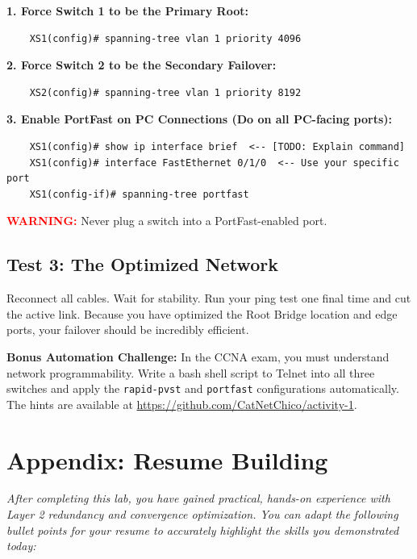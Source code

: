 \documentclass[11pt]{article}
\begin{document}
\noindent\textbf{1. Force Switch 1 to be the Primary Root:}
\begin{verbatim}
    XS1(config)# spanning-tree vlan 1 priority 4096 
\end{verbatim}

\noindent\textbf{2. Force Switch 2 to be the Secondary Failover:}
\begin{verbatim}
    XS2(config)# spanning-tree vlan 1 priority 8192
\end{verbatim}

\noindent\textbf{3. Enable PortFast on PC Connections (Do on all PC-facing ports):}
\begin{verbatim}
    XS1(config)# show ip interface brief  <-- [TODO: Explain command]
    XS1(config)# interface FastEthernet 0/1/0  <-- Use your specific port
    XS1(config-if)# spanning-tree portfast
\end{verbatim}
\textcolor{red}{\textbf{WARNING:}} Never plug a switch into a PortFast-enabled port. 

\vspace{0.5em}
\noindent {}

\subsection*{Test 3: The Optimized Network}
Reconnect all cables. Wait for stability. Run your ping test one final time and cut the active link. Because you have optimized the Root Bridge location and edge ports, your failover should be incredibly efficient.

\vspace{1em}
\noindent\textbf{Bonus Automation Challenge:} 
In the CCNA exam, you must understand network programmability. Write a bash shell script to Telnet into all three switches and apply the \texttt{rapid-pvst} and \texttt{portfast} configurations automatically. The hints are available at \url{https://github.com/CatNetChico/activity-1}. 

\newpage

\section*{Appendix: Resume Building}

\textit{After completing this lab, you have gained practical, hands-on experience with Layer 2 redundancy and convergence optimization. You can adapt the following bullet points for your resume to accurately highlight the skills you demonstrated today:}
\end{document}
